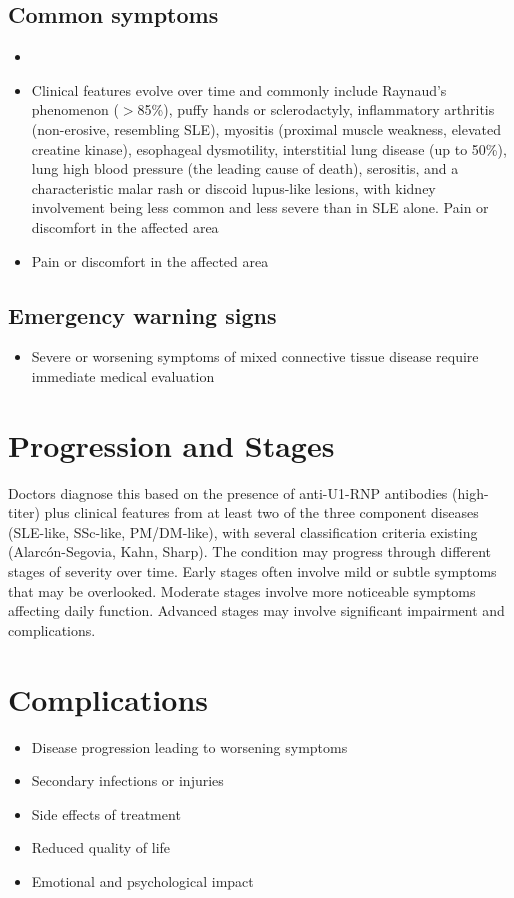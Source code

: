 \subsection{Common symptoms}
\begin{itemize}[noitemsep]
  \item \item Clinical features evolve over time and commonly include Raynaud's phenomenon ($>$85\%), puffy hands or sclerodactyly, inflammatory arthritis (non-erosive, resembling SLE), myositis (proximal muscle weakness, elevated creatine kinase), esophageal dysmotility, interstitial lung disease (up to 50\%), lung high blood pressure (the leading cause of death), serositis, and a characteristic malar rash or discoid lupus-like lesions, with kidney involvement being less common and less severe than in SLE alone. Pain or discomfort in the affected area    \item Pain or discomfort in the affected area
  \end{itemize}

\subsection{Emergency warning signs}
\begin{itemize}[noitemsep]
  \item Severe or worsening symptoms of mixed connective tissue disease require immediate medical evaluation
\end{itemize}
\section{Progression and Stages}
Doctors diagnose this based on the presence of anti-U1-RNP antibodies (high-titer) plus clinical features from at least two of the three component diseases (SLE-like, SSc-like, PM/DM-like), with several classification criteria existing (Alarcón-Segovia, Kahn, Sharp). The condition may progress through different stages of severity over time. Early stages often involve mild or subtle symptoms that may be overlooked. Moderate stages involve more noticeable symptoms affecting daily function. Advanced stages may involve significant impairment and complications.
\section{Complications}
\begin{itemize}[noitemsep]
  \item Disease progression leading to worsening symptoms
  \item Secondary infections or injuries
  \item Side effects of treatment
  \item Reduced quality of life
  \item Emotional and psychological impact
\end{itemize}
